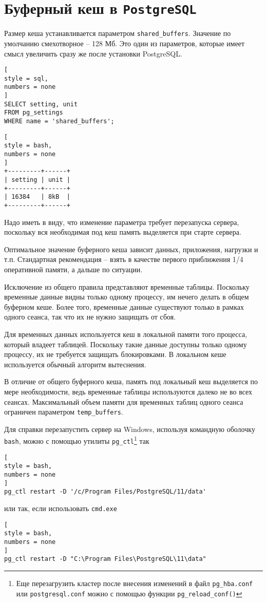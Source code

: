 \documentclass[%
	11pt,
	a4paper,
	utf8,
		]{article}
\begin{document}
\section{Буферный кеш в \texttt{PostgreSQL}}

Размер кеша устанавливается параметром \verb|shared_buffers|. Значение по умолчанию смехотворное -- 128 Мб. Это один из параметров, которые имеет смысл увеличить сразу же после установки PostgreSQL.

\begin{lstlisting}[
style = sql,
numbers = none
]
SELECT setting, unit
FROM pg_settings
WHERE name = 'shared_buffers';
\end{lstlisting}

\begin{lstlisting}[
style = bash,
numbers = none
]
+---------+------+
| setting | unit |
+---------+------+
| 16384   | 8kB  |
+---------+------+
\end{lstlisting}

Надо иметь в виду, что изменение параметра требует перезапуска сервера, поскольку вся необходимая под кеш память выделяется при старте сервера.

Оптимальное значение буферного кеша зависит данных, приложения, нагрузки и т.п. Стандартная рекомендация -- взять в качестве первого приближения 1/4 оперативной памяти, а дальше по ситуации.

Исключение из общего правила представляют временные таблицы. Поскольку временные данные видны только одному процессу, им нечего делать в общем буферном кеше. Более того, временные данные существуют только в рамках одного сеанса, так что их не нужно защищать от сбоя.

Для временных данных используется кеш в локальной памяти того процесса, который владеет таблицей. Поскольку такие данные доступны только одному процессу, их не требуется защищать блокировками. В локальном кеше используется обычный алгоритм вытеснения. 

В отличие от общего буферного кеша, память под локальный кеш выделяется по мере необходимости, ведь временные таблицы используются далеко не во всех сеансах. Максимальный объем памяти для временных таблиц одного сеанса ограничен параметром \verb|temp_buffers|.

Для справки перезапустить сервер на Windows, используя командную оболочку \texttt{bash}, можно с помощью утилиты \verb|pg_ctl|\footnote{Еще перезагрузить кластер после внесения изменений в файл \texttt{pg\_hba.conf} или \texttt{postgresql.conf} можно с помощью функции \texttt{pg\_reload\_conf()}} так
\begin{lstlisting}[
style = bash,
numbers = none
]
pg_ctl restart -D '/c/Program Files/PostgreSQL/11/data'
\end{lstlisting}
или так, если использовать \texttt{cmd.exe}
\begin{lstlisting}[
style = bash,
numbers = none
]
pg_ctl restart -D "C:\Program Files\PostgreSQL\11\data"
\end{lstlisting}
\end{document}
